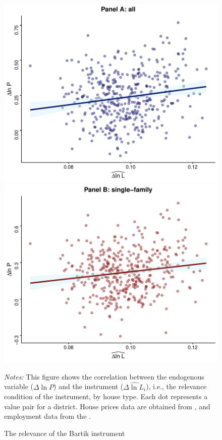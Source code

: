 \documentclass[
  12pt,
]{article}
\begin{document}
\begin{figure}[H]
\centering

\begin{center}\includegraphics[width=0.49\linewidth]{output/figs/first-stage-1} \includegraphics[width=0.49\linewidth]{output/figs/first-stage-2} \end{center}

\caption{The relevance of the Bartik instrument}\label{fig:first-stage}
\medskip
\begin{minipage}{0.9\textwidth}
\footnotesize
\textit{Notes:} This figure shows the correlation between the endogenous variable ($\Delta\ln P$) and the instrument ($\widehat{\Delta\ln L_i}$), i.e., the relevance condition of the instrument, by house type. Each dot represents a value pair for a district. House prices data are obtained from \citet{rwi2020}, and employment data from the \citet{atlasde2022}.
\end{minipage}
\end{figure}
\end{document}
